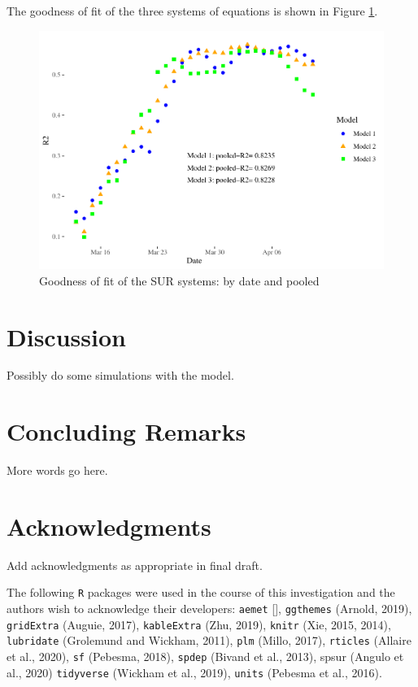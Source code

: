 \documentclass[]{elsarticle} %
\makeatletter
\def\maxwidth{\ifdim\Gin@nat@width>\linewidth\linewidth
\else\Gin@nat@width\fi}
\let\Oldincludegraphics\includegraphics
\renewcommand{\includegraphics}[1]{\Oldincludegraphics[width=\maxwidth]{#1}}
\makeatother
\begin{document}
The goodness of fit of the three systems of equations is shown in Figure
\ref{fig:goodness-of-fit}.

\begin{figure}
\centering
\includegraphics{Environmental-Correlates-of-COVID19-Spain_files/figure-latex/goodness-of-fit-1.pdf}
\caption{\label{fig:goodness-of-fit} Goodness of fit of the SUR systems:
by date and pooled}
\end{figure}

\hypertarget{discussion}{%
\section{Discussion}\label{discussion}}

Possibly do some simulations with the model.

\hypertarget{concluding-remarks}{%
\section{Concluding Remarks}\label{concluding-remarks}}

More words go here.

\hypertarget{acknowledgments}{%
\section*{Acknowledgments}\label{acknowledgments}}

Add acknowledgments as appropriate in final draft.

The following \texttt{R} packages were used in the course of this
investigation and the authors wish to acknowledge their developers:
\texttt{aemet} {[}{]}, \texttt{ggthemes} (Arnold, 2019),
\texttt{gridExtra} (Auguie, 2017), \texttt{kableExtra} (Zhu, 2019),
\texttt{knitr} (Xie, 2015, 2014), \texttt{lubridate} (Grolemund and
Wickham, 2011), \texttt{plm} (Millo, 2017), \texttt{rticles} (Allaire et
al., 2020), \texttt{sf} (Pebesma, 2018), \texttt{spdep} (Bivand et al.,
2013), spsur (Angulo et al., 2020) \texttt{tidyverse} (Wickham et al.,
2019), \texttt{units} (Pebesma et al., 2016).
\end{document}
